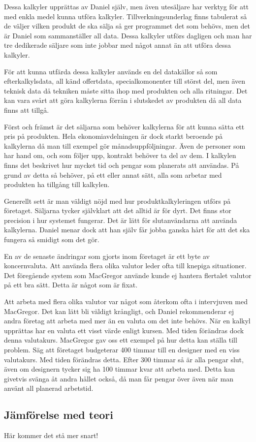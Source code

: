 Dessa kalkyler upprättas av Daniel själv, men även utesäljare har verktyg för att med enkla medel kunna utföra kalkyler. 
Tillverkningsunderlag finns tabulerat så de väljer vilken produkt de ska sälja så ger programmet det som behövs, men det är Daniel som sammanställer all data.
Dessa kalkyler utförs dagligen och man har tre dedikerade säljare som inte jobbar med något annat än att utföra dessa kalkyler.

För att kunna utfärda dessa kalkyler används en del datakällor så som efterkalkylsdata, all känd offertdata, specialkomonenter till störst del, men även teknisk data då tekniken måste sitta ihop med produkten och alla ritningar.
Det kan vara svårt att göra kalkylerna förrän i slutskedet av produkten då all data finns att tillgå.  

Först och främst är det säljarna som behöver kalkylerna för att kunna sätta ett pris på produkten.
Hela ekonomiavdelningen är dock starkt beroende på kalkylerna då man till exempel gör månadsuppföljningar.
Även de personer som har hand om, och som följer upp, kontrakt behöver ta del av dem.
I kalkylen finns det beskrivet hur mycket tid och pengar som planerats att användas.
På grund av detta så behöver, på ett eller annat sätt, alla som arbetar med produkten ha tillgång till kalkylen.

Generellt sett är man väldigt nöjd med hur produktkalkyleringen utförs på företaget.
Säljarna tycker självklart att det alltid är för dyrt.
Det finns stor precision i hur systemet fungerar.
Det är lätt för slutanvändarna att använda kalkylerna.
Daniel menar dock att han själv får jobba ganska hårt för att det ska fungera så smidigt som det gör.

En av de senaste ändringar som gjorts inom företaget är ett byte av koncernvaluta.
Att använda flera olika valutor leder ofta till knepiga situationer.
Det föregående system som MacGregor använde kunde ej hantera flertalet valutor på ett bra sätt.
Detta är något som är fixat.

Att arbeta med flera olika valutor var något som återkom ofta i intervjuven med MacGregor.
Det kan lätt bli väldigt krångligt, och Daniel rekommenderar ej andra företag att arbeta med mer än en valuta om det inte behövs.
När en kalkyl upprättas har en valuta ett visst värde enligt kursen.
Med tiden förändras dock denna valutakurs.
MacGregor gav oss ett exempel på hur detta kan ställa till problem.
Säg att företaget budgeterar 400 timmar till en designer med en viss valutakurs.
Med tiden förändras detta.
Efter 300 timmar så är alla pengar slut, även om designern tycker sig ha 100 timmar kvar att arbeta med.
Detta kan givetvis svänga åt andra hållet också, då man får pengar över även när man använt all planerad arbetstid.

%
%

\subsection{Jämförelse med teori}
Här kommer det stå mer snart!